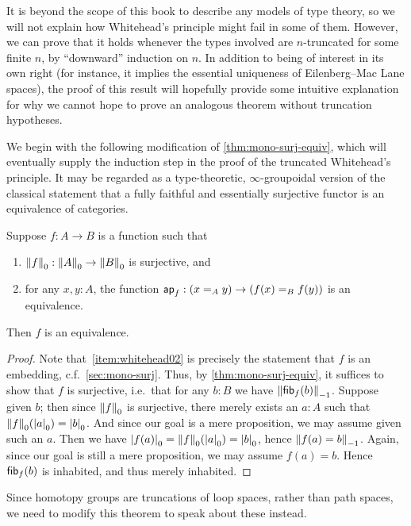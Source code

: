 It is beyond the scope of this book to describe any models of type theory, so we will not explain how Whitehead's principle might fail in some of them.
However, we can prove that it holds whenever the types involved are $n$-truncated for some finite $n$, by ``downward'' induction on $n$.
In addition to being of interest in its own right (for instance, it implies the essential uniqueness of Eilenberg--Mac Lane spaces), the proof of this result will hopefully provide some intuitive explanation for why we cannot hope to prove an analogous theorem without truncation hypotheses.

We begin with the following modification of \autoref{thm:mono-surj-equiv}, which will eventually supply the induction step in the proof of the truncated Whitehead's principle.
It may be regarded as a type-theoretic, $\infty$-group\-oid\-al version of the classical statement that a fully faithful and essentially surjective functor is an equivalence of categories.

\begin{thm}\label{thm:whitehead0}
  Suppose $f:A\to B$ is a function such that
  \begin{enumerate}
  \item $\trunc0 f : \trunc0 A \to \trunc0 B$ is surjective, and\label{item:whitehead01}
  \item for any $x,y:A$, the function $\apfunc f : (\id[A]xy) \to (\id[B]{f(x)}{f(y)})$ is an equivalence.\label{item:whitehead02}
  \end{enumerate}
  Then $f$ is an equivalence.
\end{thm}
\begin{proof}
  Note that~\ref{item:whitehead02} is precisely the statement that $f$ is an embedding, c.f.~\autoref{sec:mono-surj}.
  Thus, by \autoref{thm:mono-surj-equiv}, it suffices to show that $f$ is surjective, i.e.\ that for any $b:B$ we have $\trunc{-1}{\hfib f b}$.
  Suppose given $b$; then since $\trunc0 f$ is surjective, there merely exists an $a:A$ such that $\trunc 0 f(\tproj0a) = \tproj0b$.
  And since our goal is a mere proposition, we may assume given such an $a$.
  Then we have $\tproj0{f(a)} = \trunc 0 f(\tproj0a) =\tproj0b$, hence $\trunc{-1}{f(a)=b}$.
  Again, since our goal is still a mere proposition, we may assume $f(a)=b$.
  Hence $\hfib f b$ is inhabited, and thus merely inhabited.
\end{proof}

Since homotopy groups are truncations of loop spaces, rather than path spaces, we need to modify this theorem to speak about these instead.

